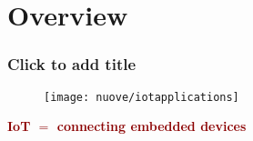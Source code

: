 \section{Overview}

	\begin{frame}[shrink]
		
		\frametitle{Click to add title}
		
		\vspace{4mm}
		\begin{figure}
			\texttt{[image: nuove/iotapplications]}
		\end{figure}
		\medskip
		\begin{center}
		{\large \bfseries\textcolor{darkred}{IoT $=$ connecting embedded devices}}
		\end{center}
	
	\end{frame}